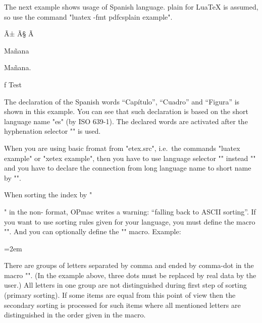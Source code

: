 The next example shows usage of Spanish language. \CS{}plain for Lua\TeX{}
is assumed, so use the command
"luatex -fmt pdfcsplain example".

\mubyte \ntie ^^c3^^b1\endmubyte \def\ntie{\~n}
\mubyte \ccedilla ^^c3^^a7\endmubyte \def\ccedilla{\c c}
\mubyte \Ccedilla ^^c3^^87\endmubyte \def\Ccedilla{\c C}

\begtt



\eslang %

\sec Mañana

Mañana.

\caption/f Test %

\bye
\endtt

The declaration of the Spanish words ``Capítulo'', ``Cuadro'' and ``Figura''
is shown in this example. You can see that such declaration is based on the
short language name "es" (by ISO 639-1). The declared words are activated
after the hyphenation selector "\eslang" is used.

When you are using basic fromat from "etex.src", i.e.\ the commands
"luatex example" or "xetex example", then you have to use language selector
"" instead "\eslang" and you  have to declare the
connection from long language name to short name by
"".

When sorting the index by "\makeindex" in the non-\csplain{} format, OPmac
writes a warning: ``falling back to ASCII sorting''.
If you want to use sorting rules given for your language, 
you must define the macro "". And you can optionally
define the "" macro. Example:
{\emergencystretch=2em\par}

\begtt
\def\sortingdataes {aAäÄáÁ,bB,cCçÇ,^^P^^Q^^R,dD,...,zZ,.}
\def\specsortingdataes {ch:^^P Ch:^^Q CH:^^R}
\endtt

There are groups of letters separated by comma and ended by comma-dot in
the macro "". (In the example above, three dots must
be replaced by real data by the user.) All letters in one group are not
distinguished during first step of sorting (primary sorting). If some items
are equal from this point of view then the secondary sorting is processed
for such items where all mentioned letters are distinguished in the order
given in the macro. 

